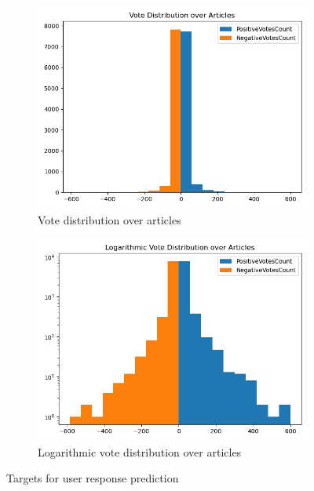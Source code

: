 \documentclass[acmsmall]{acmart}
\begin{document}
\begin{figure}[H]
\centering
\begin{subfigure}{.5\textwidth}
\centering
  \includegraphics[width=.9\linewidth]{assets/Vote_Distribution_over_Articles.png} 
  \caption{Vote distribution over articles}
  \label{fig:vote_distribution_articles}
 \end{subfigure}%
\begin{subfigure}{.5\textwidth}
\centering
  \includegraphics[width=.9\linewidth]{assets/Logarithmic_Vote_Distribution_over_Articles.png}
  \caption{Logarithmic vote distribution over articles}
    \label{fig:log_vote_distribution_articles}
 \end{subfigure}
 \caption{Targets for user response prediction}
\label{fig:user_resp_targets}
\end{figure}
\end{document}
